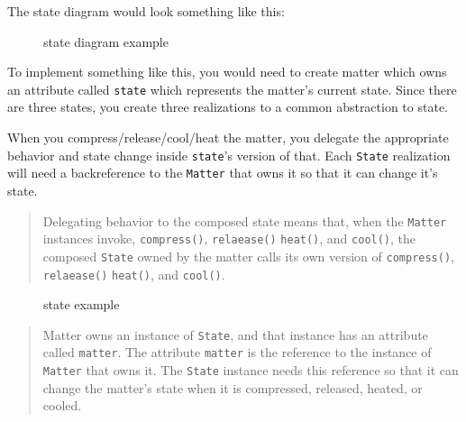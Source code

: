 The state diagram would look something like this:

\begin{figure}
\centering
{}
\caption{state diagram example}
\end{figure}

To implement something like this, you would need to create matter which
owns an attribute called \texttt{state} which represents the matter's
current state. Since there are three states, you create three
realizations to a common abstraction to state.

When you compress/release/cool/heat the matter, you delegate the
appropriate behavior and state change inside \texttt{state}'s version of
that. Each \texttt{State} realization will need a backreference to the
\texttt{Matter} that owns it so that it can change it's state.

\begin{quote}
Delegating behavior to the composed state means that, when the
\texttt{Matter} instances invoke, \texttt{compress()},
\texttt{relaease()} \texttt{heat()}, and \texttt{cool()}, the composed
\texttt{State} owned by the matter calls its own version of
\texttt{compress()}, \texttt{relaease()} \texttt{heat()}, and
\texttt{cool()}.
\end{quote}

\begin{figure}
\centering
{}
\caption{state example}
\end{figure}

\begin{quote}
Matter owns an instance of \texttt{State}, and that instance has an
attribute called \texttt{matter}. The attribute \texttt{matter} is the
reference to the instance of \texttt{Matter} that owns it. The
\texttt{State} instance needs this reference so that it can change the
matter's state when it is compressed, released, heated, or cooled.
\end{quote}


